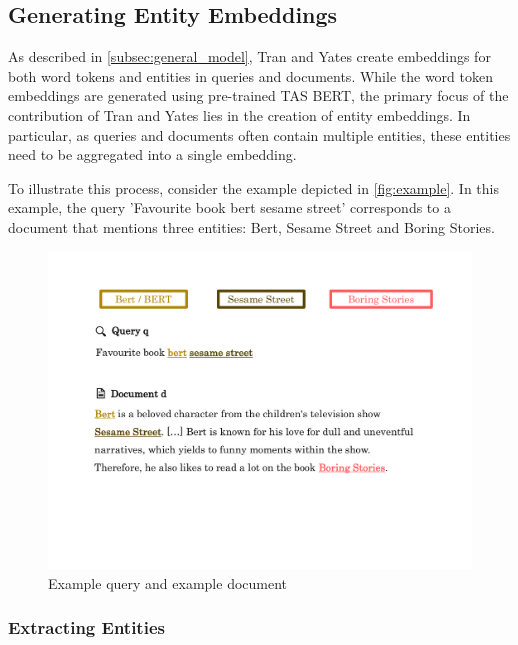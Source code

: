 \subsection{Generating Entity Embeddings\label{subsec:entity_embeddings}}

As described in \autoref{subsec:general_model}, Tran and Yates create embeddings for both word tokens and entities in queries and documents. While the word token embeddings are generated using pre-trained TAS BERT, the primary focus of the contribution of Tran and Yates lies in the creation of entity embeddings. In particular, as queries and documents often contain multiple entities, these entities need to be aggregated into a single embedding.

To illustrate this process, consider the example depicted in \autoref{fig:example}. In this example, the query 'Favourite book bert sesame street' corresponds to a document that mentions three entities: Bert, Sesame Street and Boring Stories.

\begin{figure}[!htb]
    \includegraphics[trim={1.5cm 5.5cm 1.5cm 2cm}, clip, width=\textwidth]{resources/example} 
    \caption{Example query and example document}
    \label{fig:example}
\end{figure}

\subsubsection{Extracting Entities}\label{subsubsec:extracting_entities}

